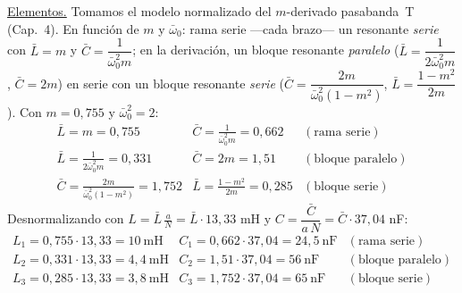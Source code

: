 \documentclass[class=article, crop=false, oneside]{standalone}
\begin{document}
\noindent\underline{Elementos.} Tomamos el modelo normalizado del $m$-derivado
pasabanda~T (Cap.~4). En función de $m$ y $\bar\omega_0$: rama serie ---cada brazo---
un resonante \emph{serie} con $\bar L=m$ y $\bar C=\dfrac{1}{\bar\omega_0^2 m}$; en la
derivación, un bloque resonante \emph{paralelo} ($\bar L=\dfrac{1}{2\bar\omega_0^2 m}$,
$\bar C=2m$) en serie con un bloque resonante \emph{serie}
($\bar C=\dfrac{2m}{\bar\omega_0^2(1-m^2)}$, $\bar L=\dfrac{1-m^2}{2m}$). Con
$m=0{,}755$ y $\bar\omega_0^2=2$:
\[
    \begin{array}{lll}
        \bar L=m=0{,}755 & \bar C=\tfrac{1}{\bar\omega_0^2 m}=0{,}662 & (\text{rama serie})\\[3pt]
        \bar L=\tfrac{1}{2\bar\omega_0^2 m}=0{,}331 & \bar C=2m=1{,}51 & (\text{bloque paralelo})\\[3pt]
        \bar C=\tfrac{2m}{\bar\omega_0^2(1-m^2)}=1{,}752 & \bar L=\tfrac{1-m^2}{2m}=0{,}285 & (\text{bloque serie})
    \end{array}
\]
Desnormalizando con $L=\bar L\,\tfrac{a}{N}=\bar L\cdot 13{,}33$ mH y $C=\dfrac{\bar C}{a\,N}=\bar C\cdot 37{,}04$ nF:
\[
    \begin{array}{lll}
        L_1 = 0{,}755\cdot 13{,}33 = 10\ \text{mH} & C_1 = 0{,}662\cdot 37{,}04 = 24{,}5\ \text{nF} & (\text{rama serie})\\[3pt]
        L_2 = 0{,}331\cdot 13{,}33 = 4{,}4\ \text{mH} & C_2 = 1{,}51\cdot 37{,}04 = 56\ \text{nF} & (\text{bloque paralelo})\\[3pt]
        L_3 = 0{,}285\cdot 13{,}33 = 3{,}8\ \text{mH} & C_3 = 1{,}752\cdot 37{,}04 = 65\ \text{nF} & (\text{bloque serie})
    \end{array}
\]

\begin{figure}[H]
    \centering
    
\end{figure}
\end{document}
